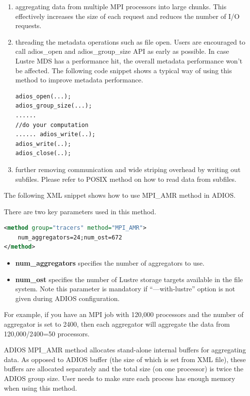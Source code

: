 \begin{enumerate}
\item aggregating data from multiple MPI processors into large chunks. This effectively 
increases the size of each request and reduces the number of I/O requests.
\item threading the metadata operations such as file open. Users are encouraged to 
call adios\_open and adios\_group\_size API as early as possible. In case Lustre 
MDS has a performance hit, the overall metadata performance won't be affected. 
The following code snippet shows a typical way of using this method to improve 
metadata performance.
\begin{lstlisting}[language=XML]
adios_open(...); 
adios_group_size(...);
...... 
//do your computation
...... adios_write(..); 
adios_write(..); 
adios_close(..);
\end{lstlisting}

\item further removing communication and wide striping overhead by writing out subfiles. 
Please refer to POSIX method on how to read data from subfiles.
\end{enumerate}

The following XML snippet shows how to use MPI\_AMR method in ADIOS.

There are two key parameters used in this method.

\begin{lstlisting}[language=XML]
<method group="tracers" method="MPI_AMR"> 
	num_aggregators=24;num_ost=672
</method>
\end{lstlisting}

\begin{itemize}
\item \textbf{num\_aggregators} specifies the number of aggregators 
to use.
\item \textbf{num\_ost }specifies the number of Lustre storage targets 
 available in the file system. Note this parameter is mandatory if ``---with-lustre'' 
option is not given during ADIOS configuration.
\end{itemize}

For example, if you have an MPI job with 120,000 processors and the number of aggregator 
is set to 2400, then each aggregator will aggregate the data from 120,000/2400=50 
processors.

ADIOS MPI\_AMR method allocates stand-alone internal buffers for aggregating data. 
As opposed to ADIOS buffer (the size of which is set from XML file), these buffers 
are allocated separately and the total size (on one processor) is twice the ADIOS 
group size. User needs to make sure each process has enough memory when using this 
method.  

